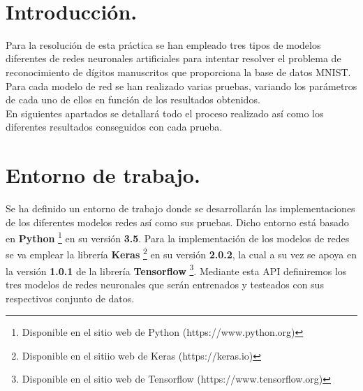 \documentclass[10pt]{article}
\begin{document}
\begin{center}
 		\\																		%
\vspace{2cm} 																				
\begin{center}																					
 			\end{center}												  						
\end{center}							 											
																					
\newpage																		

\tableofcontents 

\newpage



\section{Introducción.} 
Para la resolución de esta práctica se han empleado tres tipos de modelos diferentes de redes neuronales artificiales para intentar resolver el problema de reconocimiento de dígitos manuscritos que proporciona la base de datos MNIST. Para cada modelo de red se han realizado varias pruebas, variando los parámetros de cada uno de ellos en función de los resultados obtenidos. \\

En siguientes apartados se detallará todo el proceso realizado así como los diferentes resultados conseguidos con cada prueba. 



\section{Entorno de trabajo.} 
Se ha definido un entorno de trabajo donde se desarrollarán las implementaciones de los diferentes modelos redes así como sus pruebas. Dicho entorno está basado en \textbf{Python} \footnote{Disponible en el sitio web de Python (https://www.python.org)} en su versión \textbf{3.5}. Para la implementación de los modelos de redes se va emplear la librería \textbf{Keras} \footnote{Disponible en el sitiio web de Keras (https://keras.io)} en su versión \textbf{2.0.2}, la cual a su vez se apoya en la versión \textbf{1.0.1} de la librería \textbf{Tensorflow} \footnote{Disponible en el sitio web de Tensorflow (https://www.tensorflow.org)}. Mediante esta API definiremos los tres modelos de redes neuronales que serán entrenados y testeados con sus respectivos conjunto de datos. \\
\end{document}

